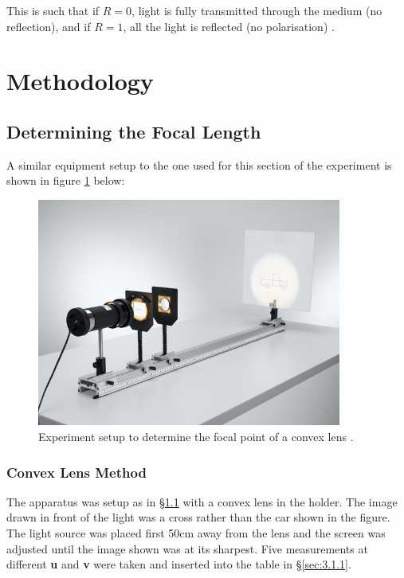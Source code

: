 \documentclass[12pt]{article}
\begin{document}
\vspace{.5cm}

This is such that if $R=0$, light is fully transmitted through the medium (no reflection), and if $R=1$, all the light is reflected (no polarisation)
\cite{UCDlens}.

\section{Methodology} \label{sec:2}

\subsection{Determining the Focal Length} \label{sec:2.1}

A similar equipment setup to the one used for this section of the experiment is shown in figure \ref{fig:lensexp} below:

\begin{figure}[H]
    \centering
    \includegraphics[width=10cm]{lens exp setup.jpg}
    \caption{\centering Experiment setup to determine the focal point of a convex lens \protect\cite{leyboldexp}.}
    \label{fig:lensexp}
\end{figure}

\subsubsection{Convex Lens Method} \label{sec:2.1.1}

The apparatus was setup as in §\ref{sec:2.1} with a convex lens in the holder. The image drawn in front of the light was a cross rather than the car shown in the figure.
The light source was placed first 50cm away from the lens and the screen was adjusted until the image shown was at its sharpest.
Five measurements at different \textbf{u} and \textbf{v} were taken and inserted into the table in §\ref{sec:3.1.1}.
\end{document}
